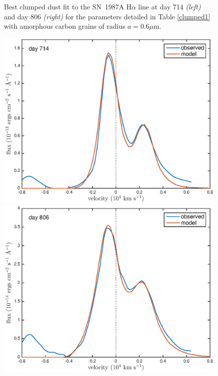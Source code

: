 \documentclass[useAMS,usenatbib,usegraphicx]{mnras}
\begin{document}
\begin{figure}
\begin{center}
\caption{Best clumped dust fit to the SN~1987A H$\alpha$ line at day 714 \textit{\textit{(left)}} and day 806 \textit{\textit{(right)}} for the parameters detailed in Table \ref{clumped1} with amorphous carbon grains of radius $a=0.6 \mu$m.}
\label{Ha_clump1}
\end{center}
\end{figure}
\begin{figure}
\begin{center}
\includegraphics[trim =33 10 45 15,clip=true,scale=0.47]{clump_1/best_fit/d714OI_new}
\includegraphics[trim =33 10 45 15,clip=true,scale=0.47]{clump_1/best_fit/d806OI_new}

\end{center}
\end{figure}
\end{document}
